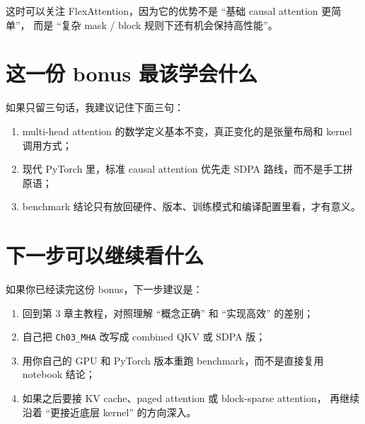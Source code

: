 \documentclass[12pt,a4paper]{ctexart}
\newcommand{\code}[1]{\texttt{#1}}
\begin{document}
这时可以关注 FlexAttention，因为它的优势不是 ``基础 causal attention 更简单''，
而是 ``复杂 mask / block 规则下还有机会保持高性能''。

\section{这一份 bonus 最该学会什么}

如果只留三句话，我建议记住下面三句：

\begin{enumerate}
  \item multi-head attention 的数学定义基本不变，真正变化的是张量布局和 kernel 调用方式；
  \item 现代 PyTorch 里，标准 causal attention 优先走 SDPA 路线，而不是手工拼原语；
  \item benchmark 结论只有放回硬件、版本、训练模式和编译配置里看，才有意义。
\end{enumerate}

\section{下一步可以继续看什么}

如果你已经读完这份 bonus，下一步建议是：

\begin{enumerate}
  \item 回到第 3 章主教程，对照理解 ``概念正确'' 和 ``实现高效'' 的差别；
  \item 自己把 \code{Ch03\_MHA} 改写成 combined QKV 或 SDPA 版；
  \item 用你自己的 GPU 和 PyTorch 版本重跑 benchmark，而不是直接复用 notebook 结论；
  \item 如果之后要接 KV cache、paged attention 或 block-sparse attention，
  再继续沿着 ``更接近底层 kernel'' 的方向深入。
\end{enumerate}
\end{document}
